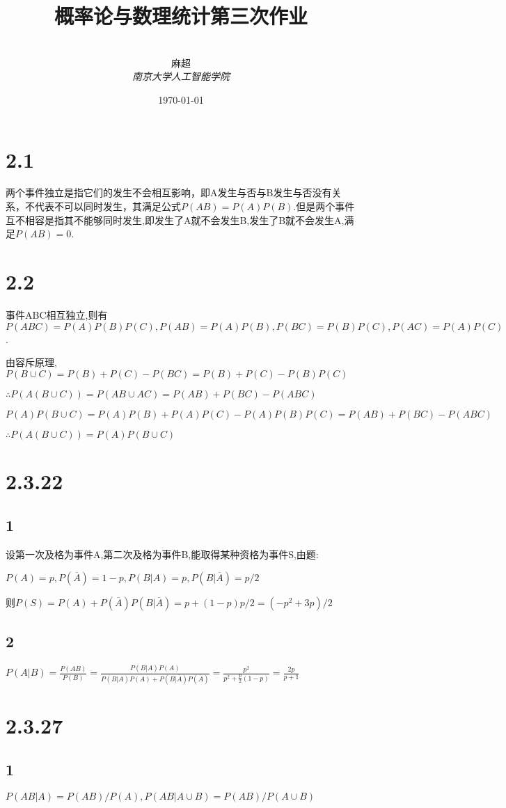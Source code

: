 \documentclass[12pt,a4paper]{ctexart}
\title{\textbf{概率论与数理统计第三次作业}}
\author{
\\
\Large{麻超 \quad 201300066}
\\[6pt]
{ \large \textit{南京大学人工智能学院}}\\[2pt]
}
\date{\today}
\begin{document}
\maketitle
\setcounter{page}{1}

\section*{2.1}
两个事件独立是指它们的发生不会相互影响，即A发生与否与B发生与否没有关系，不代表不可以同时发生，其满足公式$P(AB)=P(A)P(B)$.但是两个事件互不相容是指其不能够同时发生,即发生了A就不会发生B,发生了B就不会发生A,满足$P(AB)=0$.
\section*{2.2}
事件ABC相互独立,则有$P(ABC)=P(A)P(B)P(C),P(AB)=P(A)P(B),P(BC)=P(B)P(C),P(AC)=P(A)P(C)$.

由容斥原理,$P(B\cup C)=P(B)+P(C)-P(BC)=P(B)+P(C)-P(B)P(C)$

$\therefore P(A(B\cup C))=P(AB\cup AC)=P(AB)+P(BC)-P(ABC)$

$P(A)P(B\cup C)=P(A)P(B)+P(A)P(C)-P(A)P(B)P(C)=P(AB)+P(BC)-P(ABC)$

$\therefore P(A(B\cup C))=P(A)P(B\cup C)$

\section*{2.3.22}
\subsection*{1}
设第一次及格为事件A,第二次及格为事件B,能取得某种资格为事件S,由题:

$P(A)=p,P(\overline{A})=1-p,P(B|A)=p,P(B|\overline{A})=p/2$

则$P(S)=P(A)+P(\overline{A})P(B|\overline{A})=p+(1-p)p/2=(-p^2+3p)/2$
\subsection*{2}
$P(A|B)=\frac{P(AB)}{P(B)}=\frac{P(B|A)P(A)}{P(B|A)P(A)+P(B|\overline{A})P(\overline{A})}=\frac{p^2}{p^2+\frac{p}{2}(1-p)}=\frac{2p}{p+1}$

\section*{2.3.27}
\subsection*{1}
$P(AB|A)=P(AB)/P(A),P(AB|A\cup B)=P(AB)/P(A\cup B)$
\end{document}
